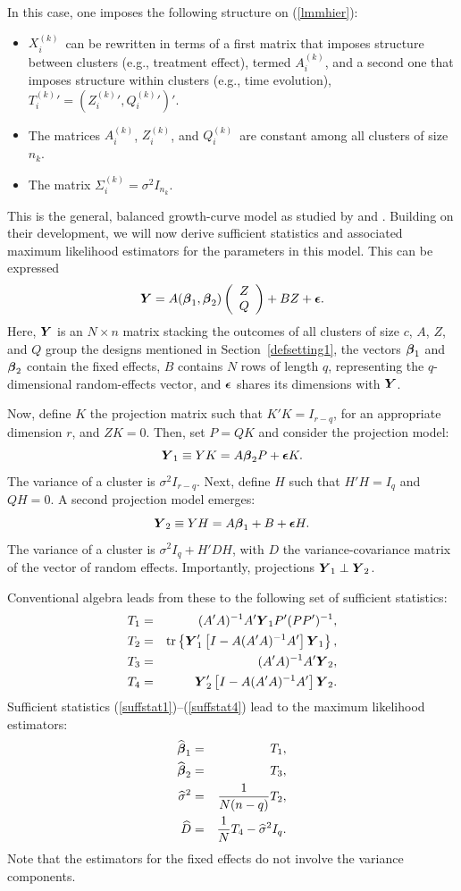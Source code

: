 \documentclass[11pt,a5paper,twoside]{book}
\newcommand{\BY}{\mbox{\boldmath $Y$}}
\newcommand{\tr}{\mbox{tr}}
\newcommand{\Zik}{\mbox{$Z_i^{(k)}$}}
\newcommand{\bfbeta}{\mbox{\boldmath $\beta$}}
\newcommand{\beps}{\mbox{\boldmath $\epsilon$}}
\newcommand{\Xik}{\mbox{$X_i^{(k)}$}}
\newcommand{\Aik}{\mbox{$A_i^{(k)}$}}
\newcommand{\Tik}{\mbox{$T_i^{(k)}$}}
\newcommand{\Qik}{\mbox{$Q_i^{(k)}$}}
\begin{document}
{In this case, one imposes the following structure on (\ref{lmmhier}):
\begin{itemize}
\item \Xik\ can be rewritten in terms of a first matrix that imposes structure between clusters (e.g., treatment effect), termed \Aik, and a second one that imposes structure within clusters (e.g., time evolution), $\Tik'=(\Zik',\Qik')'$.
\item The matrices \Aik, \Zik, and \Qik\ are constant among all clusters of size~$n_k$.
\item The matrix $\Sigma_i^{(k)}=\sigma^2I_{n_k}$.
\end{itemize}
This is the general, balanced growth-curve model as studied by \cite{lange1989effect} and \cite{verbeke2007effect}.
\label{setting1est}
Building on their development, we will now derive sufficient statistics and associated maximum likelihood estimators for the parameters in this model. This can be expressed
$$\BY=A(\bfbeta_1,\bfbeta_2)\left(
\begin{array}{c}
Z\\
Q
\end{array}
\right)
 +
BZ
+\beps.
$$
Here, $\BY$ is an $N\times n$ matrix stacking the outcomes of all clusters of size $c$, $A$, $Z$, and $Q$ group the designs mentioned in Section~\ref{defsetting1}, the vectors $\bfbeta_1$ and $\bfbeta_2$ contain the fixed effects, $B$ contains $N$ rows of length $q$, representing the $q$-dimensional random-effects vector, and $\beps$ shares its dimensions with $\BY$.

Now, define $K$ the projection matrix such that $K'K=I_{r-q}$, for an appropriate dimension $r$, and $ZK=0$. Then, set $P=QK$ and consider the projection model:
$$\BY_1\equiv YK=A\bfbeta_2P+\beps K.$$
The variance of a cluster is $\sigma^2I_{r-q}$. Next, define $H$ such that $H'H=I_q$ and $QH=0$. A second projection model emerges:
$$\BY_2\equiv YH=A\bfbeta_1+B+\beps H.$$
The variance of a cluster is $\sigma^2I_q+H'DH$, with $D$ the variance-covariance matrix of the vector of random effects. Importantly, projections $\BY_1\perp \BY_2$.

Conventional algebra leads from these to the following set of sufficient statistics:
\begin{eqnarray}
\label{suffstat1}
T_1&=&(A'A)^{-1}A'\BY_1P'(PP')^{-1},\\
T_2&=&\tr\left\{
\BY_1'\left[I-A(A'A)^{-1}A'\right]\BY_1
\right\},
\\
T_3&=&(A'A)^{-1}A'\BY_2,\\
T_4&=&\BY_2'\left[I-A(A'A)^{-1}A'\right]\BY_2.
\label{suffstat4}
\end{eqnarray}
Sufficient statistics (\ref{suffstat1})--(\ref{suffstat4}) lead to the maximum likelihood estimators:
\begin{eqnarray}
\label{est1}
\widehat{\bfbeta}_1&=&T_1,\\
\widehat{\bfbeta}_2&=&T_3,\\
\widehat{\sigma}^2&=&\frac{1}{N(n-q)}T_2,\\
\widehat{D}&=&\frac{1}{N}T_4-\widehat{\sigma}^2I_q.
\label{est4}
\end{eqnarray}
Note that the estimators for the fixed effects do not involve the variance components.

}
\end{document}
